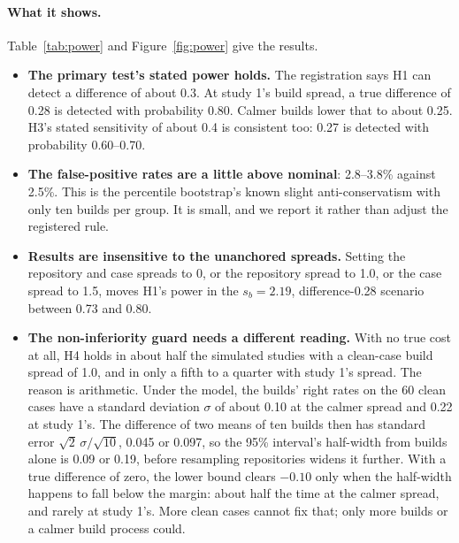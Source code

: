 \documentclass[11pt]{article}
\begin{document}
\paragraph{What it shows.}
Table~\ref{tab:power} and Figure~\ref{fig:power} give the results.

\begin{itemize}
  \item \textbf{The primary test's stated power holds.} The registration says H1 can detect a
  difference of about 0.3. At study 1's build spread, a true difference of 0.28 is detected with
  probability 0.80. Calmer builds lower that to about 0.25. H3's stated sensitivity of about 0.4
  is consistent too: 0.27 is detected with probability 0.60--0.70.
  \item \textbf{The false-positive rates are a little above nominal}: 2.8--3.8\% against 2.5\%.
  This is the percentile bootstrap's known slight anti-conservatism with only ten builds per
  group. It is small, and we report it rather than adjust the registered rule.
  \item \textbf{Results are insensitive to the unanchored spreads.} Setting the repository and
  case spreads to 0, or the repository spread to 1.0, or the case spread to 1.5, moves H1's power
  in the $s_b=2.19$, difference-0.28 scenario between 0.73 and 0.80.
  \item \textbf{The non-inferiority guard needs a different reading.} With no true cost at all, H4 holds
  in about half the simulated studies with a clean-case build spread of 1.0, and in only a fifth
  to a quarter with study 1's spread. The reason is arithmetic. Under the model, the builds' right
  rates on the 60 clean cases have a standard deviation $\sigma$ of about 0.10 at the calmer
  spread and 0.22 at study 1's. The difference of two means of ten builds then has standard error
  $\sqrt{2}\,\sigma/\sqrt{10}$, 0.045 or 0.097, so the 95\% interval's half-width from builds
  alone is 0.09 or 0.19, before resampling repositories widens it further. With a true difference
  of zero, the lower bound clears $-0.10$ only when the half-width happens to fall below the
  margin: about half the time at the calmer spread, and rarely at study 1's. More clean cases
  cannot fix that; only more builds or a calmer build process could.
\end{itemize}
\end{document}
